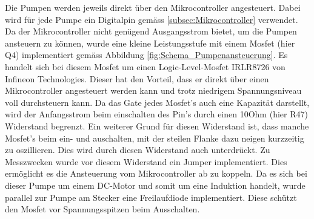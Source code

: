 Die Pumpen werden jeweils direkt über den Mikrocontroller angesteuert. Dabei wird für jede Pumpe ein Digitalpin gemäss \ref{subsec:Mikrocontroller} verwendet. Da der Mikrocontroller nicht genügend Ausgangsstrom bietet, um die Pumpen ansteuern zu können, wurde eine kleine Leistungsstufe mit einem Mosfet (hier Q4) implementiert gemäss Abbildung \ref{fig:Schema_Pumpenansteuerung}. Es handelt sich bei diesem Mosfet um einen Logic-Level-Mosfet IRLR8726 von Infineon Technologies. Dieser hat den Vorteil, dass er direkt über einen Mikrocontroller angesteuert werden kann und trotz niedrigem Spannungsniveau voll durchsteuern kann. Da das Gate jedes Mosfet's auch eine Kapazität darstellt, wird der Anfangsstrom beim einschalten des Pin's durch einen 10Ohm (hier R47) Widerstand begrenzt. Ein weiterer Grund für diesen Widerstand ist, dass manche Mosfet's beim ein- und auschalten, mit der steilen Flanke dazu neigen kurzzeitig zu oszillieren. Dies wird durch diesen Widerstand auch unterdrückt. Zu Messzwecken wurde vor diesem Widerstand ein Jumper implementiert. Dies ermöglicht es die Ansteuerung vom Mikrocontroller ab zu koppeln. Da es sich bei dieser Pumpe um einem DC-Motor und somit um eine Induktion handelt, wurde parallel zur Pumpe am Stecker eine Freilaufdiode implementiert. Diese schützt den Mosfet vor Spannungsspitzen beim Ausschalten. \cite[S.362]{atmel_atmel_2014} \cite{aiyimaindustrial_store_us_nodate} \cite{mouser_mp24943dn-lf_nodate}

